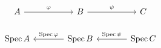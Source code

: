 \[
\begin{tikzcd}[column sep=large]
A \arrow[r,"\varphi"] & B \arrow[r,"\psi"] & C\\
\Spec A & \Spec B \arrow[l,"\Spec\varphi"'] & \Spec C \arrow[l,"\Spec\psi"']
\end{tikzcd}
\]
